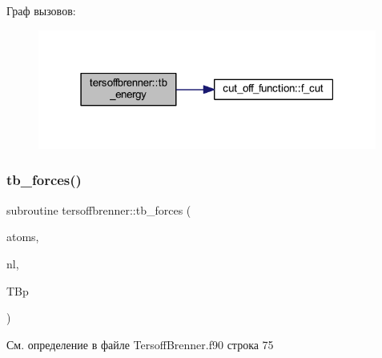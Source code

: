 Граф вызовов\+:\nopagebreak
\begin{figure}[H]
\begin{center}
\leavevmode
\includegraphics[width=316pt]{namespacetersoffbrenner_a273a6849892363697886b1f1d0f8df93_cgraph}
\end{center}
\end{figure}
\mbox{\label{namespacetersoffbrenner_a1edc8ac251b3fa58026839db4d23f12a}} 
\subsubsection{\texorpdfstring{tb\+\_\+forces()}{tb\_forces()}}
{\footnotesize\ttfamily subroutine tersoffbrenner\+::tb\+\_\+forces (\begin{DoxyParamCaption}\item[{type(\mbox{\hyperlink{structmd__general_1_1particles}{particles}})}]{atoms,  }\item[{type(\mbox{\hyperlink{structmd__general_1_1neighbour__list}{neighbour\+\_\+list}})}]{nl,  }\item[{type(\mbox{\hyperlink{structtersoffbrenner_1_1tersoffbrenner__parameters}{tersoffbrenner\+\_\+parameters}})}]{T\+Bp }\end{DoxyParamCaption})}



См. определение в файле Tersoff\+Brenner.\+f90 строка 75


